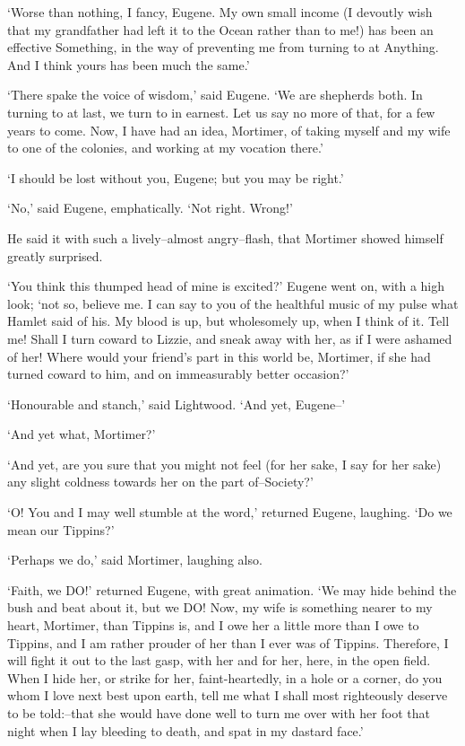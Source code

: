 ‘Worse than nothing, I fancy, Eugene. My own small income (I devoutly
wish that my grandfather had left it to the Ocean rather than to me!)
has been an effective Something, in the way of preventing me from
turning to at Anything. And I think yours has been much the same.’

‘There spake the voice of wisdom,’ said Eugene. ‘We are shepherds both.
In turning to at last, we turn to in earnest. Let us say no more of
that, for a few years to come. Now, I have had an idea, Mortimer, of
taking myself and my wife to one of the colonies, and working at my
vocation there.’

‘I should be lost without you, Eugene; but you may be right.’

‘No,’ said Eugene, emphatically. ‘Not right. Wrong!’

He said it with such a lively--almost angry--flash, that Mortimer showed
himself greatly surprised.

‘You think this thumped head of mine is excited?’ Eugene went on, with a
high look; ‘not so, believe me. I can say to you of the healthful music
of my pulse what Hamlet said of his. My blood is up, but wholesomely up,
when I think of it. Tell me! Shall I turn coward to Lizzie, and sneak
away with her, as if I were ashamed of her! Where would your friend’s
part in this world be, Mortimer, if she had turned coward to him, and on
immeasurably better occasion?’

‘Honourable and stanch,’ said Lightwood. ‘And yet, Eugene--’

‘And yet what, Mortimer?’

‘And yet, are you sure that you might not feel (for her sake, I say for
her sake) any slight coldness towards her on the part of--Society?’

‘O! You and I may well stumble at the word,’ returned Eugene, laughing.
‘Do we mean our Tippins?’

‘Perhaps we do,’ said Mortimer, laughing also.

‘Faith, we DO!’ returned Eugene, with great animation. ‘We may hide
behind the bush and beat about it, but we DO! Now, my wife is something
nearer to my heart, Mortimer, than Tippins is, and I owe her a little
more than I owe to Tippins, and I am rather prouder of her than I ever
was of Tippins. Therefore, I will fight it out to the last gasp, with
her and for her, here, in the open field. When I hide her, or strike
for her, faint-heartedly, in a hole or a corner, do you whom I love next
best upon earth, tell me what I shall most righteously deserve to be
told:--that she would have done well to turn me over with her foot that
night when I lay bleeding to death, and spat in my dastard face.’

